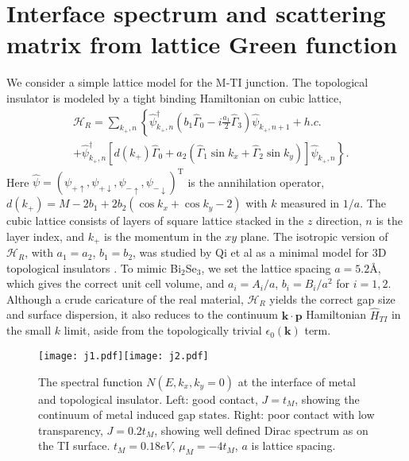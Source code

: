 \documentclass[11pt]{report}
\def\v#1{\mathbf{#1}}
\newcommand{\kp}{k_{+}}
\begin{document}
\section{Interface spectrum and scattering matrix from lattice Green function} 

We consider a simple lattice model for the M-TI junction.
The topological insulator is modeled by 
a tight binding Hamiltonian on cubic lattice,
\begin{align*}
&\mathscr{H}_R=\sum_{\kp,n}\left\{ 
\hat{\psi}_{\kp,n}^\dagger (b_1\hat{\Gamma}_0-i\frac{a_1}{2}\hat{\Gamma}_3)  \hat{\psi}_{\kp,n+1}+ h.c. \right. \\
&+\left. 
\hat{\psi}_{\kp,n}^\dagger\left[d(\kp)\hat{\Gamma}_0+a_2(\hat{\Gamma}_1\sin k_x +\hat{\Gamma}_2\sin k_y)\right] \hat{\psi}_{\kp,n} \right\} .
\end{align*}
Here $\hat{\psi}=(\psi_{+\uparrow},\psi_{+\downarrow},\psi_{-\uparrow},\psi_{-\downarrow})^\mathrm{T}$ is the annihilation operator, $d(\kp)=M-2b_1+2b_2(\cos k_x+\cos k_y-2)$ with $k$ measured in $1/a$. 
The cubic lattice consists of layers of square lattice stacked in the $z$ direction,
$n$ is the layer index, and $\kp$ is the momentum in the $xy$ plane.
The isotropic version of $\mathscr{H}_R$, with $a_1=a_2$, $b_1=b_2$, was 
studied by Qi et al as a minimal model for 3D topological insulators \cite{qi_field}.
To mimic Bi$_2$Se$_3$, we set the lattice spacing $a=5.2$\AA, which gives the correct unit cell volume, 
and $a_i=A_i/a$, $b_i=B_i/a^2$ for $i=1,2$. Although a crude caricature 
of the real material, $\mathscr{H}_R$ yields the correct gap size and surface dispersion, it also reduces to 
the continuum  $\mathbf{k\cdot p}$ Hamiltonian $\hat{H}_{TI}$ in the small $k$ limit, 
aside from the topologically trivial $\epsilon_0(\v{k})$ term.
 
\begin{figure}
\texttt{[image: j1.pdf]}\texttt{[image: j2.pdf]}
\caption{The spectral function $N(E,k_x,k_y=0)$ at the interface of metal and topological insulator. Left: 
good contact, $J=t_M$, showing the continuum of metal induced gap states. 
Right: poor contact with low transparency, $J=0.2t_M$, showing well 
defined Dirac spectrum as on the TI surface. $t_M=0.18eV$, $\mu_M=-4t_M$, $a$ is lattice spacing.}
\end{figure}
 
\end{document}
